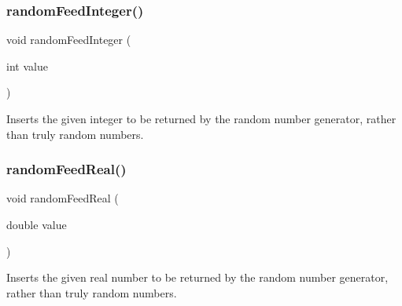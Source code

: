 \subsubsection{\texorpdfstring{random\+Feed\+Integer()}{randomFeedInteger()}}
{\footnotesize\ttfamily void random\+Feed\+Integer (\begin{DoxyParamCaption}\item[{int}]{value }\end{DoxyParamCaption})}



Inserts the given integer to be returned by the random number generator, rather than truly random numbers. 

\mbox{\label{namespaceautograder_aa82b490cbbce99abe6b30f854ff8112d}} 
\subsubsection{\texorpdfstring{random\+Feed\+Real()}{randomFeedReal()}}
{\footnotesize\ttfamily void random\+Feed\+Real (\begin{DoxyParamCaption}\item[{double}]{value }\end{DoxyParamCaption})}



Inserts the given real number to be returned by the random number generator, rather than truly random numbers. 

